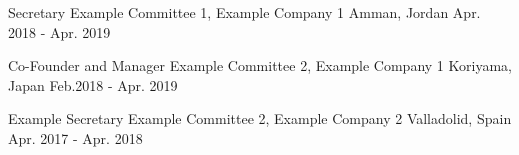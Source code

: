

\begin{cvposition}

  \cvhonor
    {Secretary} %
    {Example Committee 1, Example Company 1} %
    {Amman, Jordan} %
    {Apr. 2018 - Apr. 2019} %

  \cvhonor
    {Co-Founder and Manager} %
    {Example Committee 2, Example Company 1} %
    {Koriyama, Japan} %
    {Feb.2018 - Apr. 2019} %

  \cvhonor
    {Example Secretary} %
    {Example Committee 2, Example Company 2} %
    {Valladolid, Spain} %
    {Apr. 2017 - Apr. 2018} %


\end{cvposition}
